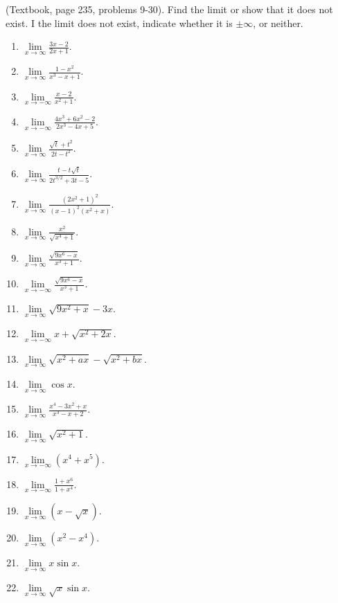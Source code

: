 (Textbook, page 235, problems 9-30).
Find the limit or show that it does not exist. I the limit does not exist, indicate whether it is $\pm\infty$, or neither. 
\begin{multicols}{3}
\begin{enumerate}
\item $\lim\limits_{x\to\infty }\frac{3x-2}{2x+1}$.
\item $\lim\limits_{x\to\infty }\frac{1-x^2}{x^3-x+1}$.
\item $\lim\limits_{x\to-\infty }\frac{x-2}{x^2+1}$.
\item $\lim\limits_{x\to-\infty }\frac{4x^3+6x^2-2}{2x^3-4x+5}$.
\item $\lim\limits_{x\to\infty }\frac{\sqrt{t}+t^2}{2t-t^2}$.
\item $\lim\limits_{x\to\infty }\frac{t-t\sqrt{t}}{2t^{3/2}+3t-5}$.
\item $\lim\limits_{x\to\infty }\frac{(2x^2+1)^2}{(x-1)^2(x^2+x)}$.
\item $\lim\limits_{x\to\infty }\frac{x^2}{\sqrt{x^4+1}}$.
\item $\lim\limits_{x\to\infty }\frac{\sqrt{9x^6-x}}{x^3+1}$.
\item $\lim\limits_{x\to-\infty }\frac{\sqrt{9x^6-x}}{x^3+1}$.
\item $\lim\limits_{x\to\infty}\sqrt{9x^2+x}-3x$.

\item $\lim\limits_{x\to-\infty}x+\sqrt{x^2+2x} $.

\item $\lim\limits_{x\to\infty}\sqrt{x^2+ax}-\sqrt{x^2+bx}$.

\item $\lim\limits_{x\to\infty}\cos x$.
\item $\lim\limits_{x\to\infty}\frac{x^4-3x^2+x}{x^3-x+2}$.

\answer{$\infty$}
\item $\lim\limits_{x\to\infty}\sqrt{x^2+1}$.

\answer{$\infty$}
\item $\lim\limits_{x\to-\infty}(x^4+x^5)$.

\answer{$-\infty$}
\item $\lim\limits_{x\to-\infty}\frac{1+x^6}{1+x^4}$.

\answer{$\infty$}
\item $\lim\limits_{x\to\infty}(x-\sqrt{x})$.

\answer{$\infty$}
\item $\lim\limits_{x\to\infty}(x^2-x^4)$.

\answer{$-\infty$}
\item $\lim\limits_{x\to\infty}x\sin x$.

\item $\lim\limits_{x\to\infty}\sqrt{x}\sin x$.

\end{enumerate}
\end{multicols}